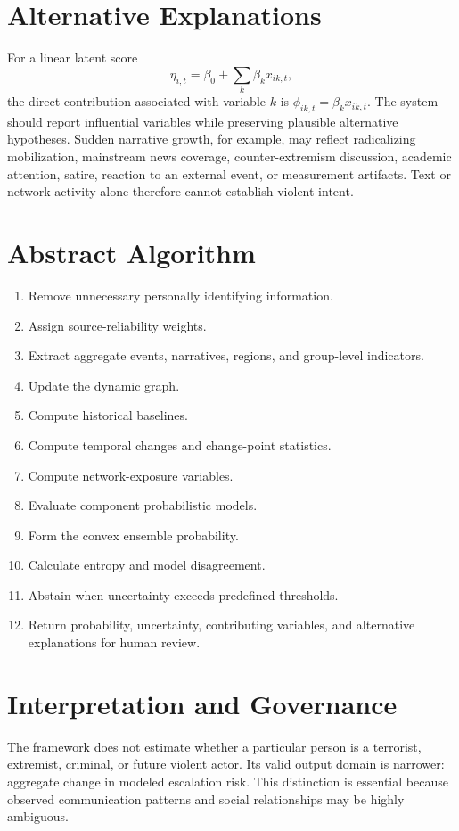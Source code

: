 \documentclass[11pt,letterpaper]{article}
\begin{document}
\section{Alternative Explanations}
For a linear latent score
\begin{equation}
\eta_{i,t}=\beta_0+\sum_k\beta_kx_{ik,t},
\end{equation}
the direct contribution associated with variable $k$ is $\phi_{ik,t}=\beta_kx_{ik,t}$. The system should report influential variables while preserving plausible alternative hypotheses. Sudden narrative growth, for example, may reflect radicalizing mobilization, mainstream news coverage, counter-extremism discussion, academic attention, satire, reaction to an external event, or measurement artifacts. Text or network activity alone therefore cannot establish violent intent.

\section{Abstract Algorithm}
\begin{enumerate}[leftmargin=2em]
\item Remove unnecessary personally identifying information.
\item Assign source-reliability weights.
\item Extract aggregate events, narratives, regions, and group-level indicators.
\item Update the dynamic graph.
\item Compute historical baselines.
\item Compute temporal changes and change-point statistics.
\item Compute network-exposure variables.
\item Evaluate component probabilistic models.
\item Form the convex ensemble probability.
\item Calculate entropy and model disagreement.
\item Abstain when uncertainty exceeds predefined thresholds.
\item Return probability, uncertainty, contributing variables, and alternative explanations for human review.
\end{enumerate}

\section{Interpretation and Governance}
The framework does not estimate whether a particular person is a terrorist, extremist, criminal, or future violent actor. Its valid output domain is narrower: aggregate change in modeled escalation risk. This distinction is essential because observed communication patterns and social relationships may be highly ambiguous.
\end{document}
